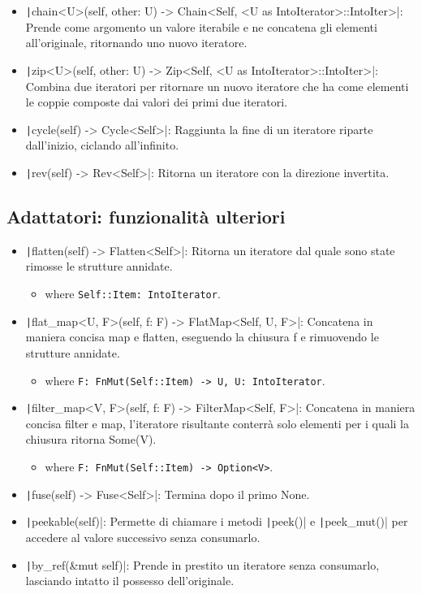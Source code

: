 \begin{itemize}
  \item \texttt|chain<U>(self, other: U) -> Chain<Self, <U as IntoIterator>::IntoIter>|: Prende come argomento un valore iterabile e ne concatena gli elementi all'originale, ritornando uno nuovo iteratore.
  \item \texttt|zip<U>(self, other: U) -> Zip<Self, <U as IntoIterator>::IntoIter>|: Combina due iteratori per ritornare un nuovo iteratore che ha come elementi le coppie composte dai valori dei primi due iteratori.
  \item \texttt|cycle(self) -> Cycle<Self>|: Raggiunta la fine di un iteratore riparte dall'inizio, ciclando all'infinito.
  \item \texttt|rev(self) -> Rev<Self>|: Ritorna un iteratore con la direzione invertita.
\end{itemize}


\subsection{Adattatori: funzionalità ulteriori}

\begin{itemize}
  \item \texttt|flatten(self) -> Flatten<Self>|: Ritorna un iteratore dal quale sono state rimosse le strutture annidate.
        \begin{itemize}
          \item[] where \verb|Self::Item: IntoIterator|.
        \end{itemize}
  \item \texttt|flat_map<U, F>(self, f: F) -> FlatMap<Self, U, F>|: Concatena in maniera concisa map e flatten, eseguendo la chiusura f e rimuovendo le strutture annidate.
        \begin{itemize}
          \item[] where \verb|F: FnMut(Self::Item) -> U, U: IntoIterator|.
        \end{itemize}
  \item \texttt|filter_map<V, F>(self, f: F) -> FilterMap<Self, F>|: Concatena in maniera concisa filter e map, l'iteratore risultante conterrà solo elementi per i quali la chiusura ritorna Some(V).
        \begin{itemize}
          \item[] where \verb|F: FnMut(Self::Item) -> Option<V>|.
        \end{itemize}
  \item \texttt|fuse(self) -> Fuse<Self>|: Termina dopo il primo None.
  \item \texttt|peekable(self)|: Permette di chiamare i metodi \texttt|peek()| e \texttt|peek_mut()| per accedere al valore successivo senza consumarlo.
  \item \texttt|by_ref(&mut self)|: Prende in prestito un iteratore senza consumarlo, lasciando intatto il possesso dell'originale.
\end{itemize}

